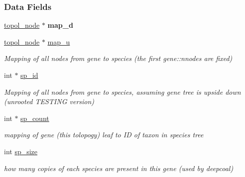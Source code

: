 \subsubsection*{Data Fields}
\begin{DoxyCompactItemize}
\item 
\mbox{\label{structreconciliation__struct_ac47989dd9997713d7024c27654fff1a9}} 
\hyperlink{structtopol__node__struct}{topol\+\_\+node} $\ast$ {\bfseries map\+\_\+d}
\item 
\mbox{\label{structreconciliation__struct_af30cb9a5323cff3cf6c16e020c2ea6ae}} 
\hyperlink{structtopol__node__struct}{topol\+\_\+node} $\ast$ \hyperlink{structreconciliation__struct_af30cb9a5323cff3cf6c16e020c2ea6ae}{map\+\_\+u}
\begin{DoxyCompactList}\small\item\em Mapping of all nodes from gene to species (the first gene\+::nnodes are fixed) \end{DoxyCompactList}\item 
\mbox{\label{structreconciliation__struct_a58d7c66720179b77ae0aa54911d11c1f}} 
int $\ast$ \hyperlink{structreconciliation__struct_a58d7c66720179b77ae0aa54911d11c1f}{sp\+\_\+id}
\begin{DoxyCompactList}\small\item\em Mapping of all nodes from gene to species, assuming gene tree is upside down (unrooted T\+E\+S\+T\+I\+NG version) \end{DoxyCompactList}\item 
\mbox{\label{structreconciliation__struct_a2b5f260452d8240e46afd2604b975e14}} 
int $\ast$ \hyperlink{structreconciliation__struct_a2b5f260452d8240e46afd2604b975e14}{sp\+\_\+count}
\begin{DoxyCompactList}\small\item\em mapping of gene (this tolopogy) leaf to ID of taxon in species tree \end{DoxyCompactList}\item 
\mbox{\label{structreconciliation__struct_a89ac1a00c6c775cb5769396e832e58ef}} 
int \hyperlink{structreconciliation__struct_a89ac1a00c6c775cb5769396e832e58ef}{sp\+\_\+size}
\begin{DoxyCompactList}\small\item\em how many copies of each species are present in this gene (used by deepcoal) \end{DoxyCompactList}\item 

\end{DoxyCompactItemize}
